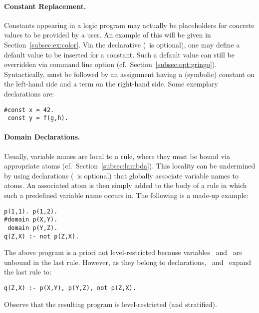 \paragraph{Constant Replacement.}
Constants appearing in a logic program may actually be placeholders for
concrete values to be provided by a user.
An example of this will be given in Section~\ref{subsec:ex:color}.
Via the  declarative (\code{\#}~is optional),
one may define a default value to be inserted for a constant.
Such a default value can still be overridden via command line option
 (cf.\ Section~\ref{subsec:opt:gringo}).
Syntactically,  must be followed by an assignment having
a (symbolic) constant on the left-hand side and a term on the right-hand side.
Some exemplary  declarations are:
%
\begin{lstlisting}[numbers=none]
#const x = 42.
 const y = f(g,h).
\end{lstlisting}

\paragraph{Domain Declarations.}
Usually, variable names are local to a rule,
where they must be bound via appropriate atoms (cf.\ Section~\ref{subsec:lambda}).
This locality can be undermined by using
 declarations (\code{\#}~is optional)
that globally associate variable names to atoms.
An associated atom is then simply added to the body of a rule in which
such a predefined variable name occurs in.
The following is a made-up example:
%
\begin{lstlisting}[numbers=none]
p(1,1). p(1,2).
#domain p(X,Y).
 domain p(Y,Z).
q(Z,X) :- not p(Z,X).
\end{lstlisting}
%
The above program is a priori not level-restricted because
variables~ and~ are unbound in the last rule.
However, as they belong to  declarations,
\gringo\ and \clingo\ expand the last rule to:
%
\begin{lstlisting}[numbers=none]
q(Z,X) :- p(X,Y), p(Y,Z), not p(Z,X).
\end{lstlisting}
%
Observe that the resulting program is level-restricted (and stratified).

